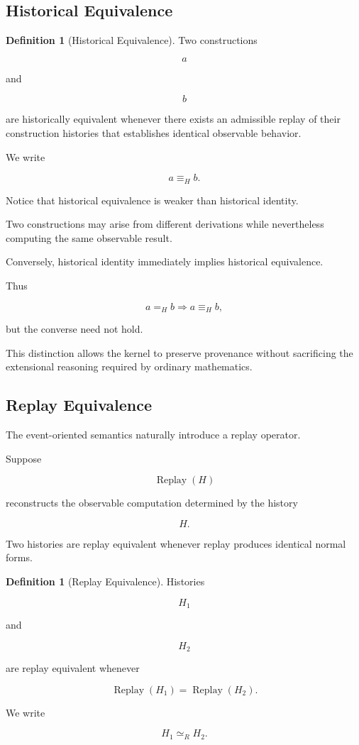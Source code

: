 \documentclass[12pt,oneside]{article}
\theoremstyle{definition}
\newtheorem{definition}[theorem]{Definition}
\theoremstyle{remark}
\DeclareMathOperator{\Replay}{Replay}
\begin{document}
\subsection{Historical Equivalence}

\begin{definition}[Historical Equivalence]

Two constructions

\[
a
\]

and

\[
b
\]

are historically equivalent whenever there exists an admissible replay of their
construction histories that establishes identical observable behavior.

We write

\[
a
\equiv_H
b.
\]

\end{definition}

Notice that historical equivalence is weaker than historical identity.

Two constructions may arise from different derivations while nevertheless
computing the same observable result.

Conversely, historical identity immediately implies historical equivalence.

Thus

\[
a
=
_H
b
\Longrightarrow
a
\equiv_H
b,
\]

but the converse need not hold.

This distinction allows the kernel to preserve provenance without sacrificing
the extensional reasoning required by ordinary mathematics.

\subsection{Replay Equivalence}

The event-oriented semantics naturally introduce a replay operator.

Suppose

\[
\Replay(H)
\]

reconstructs the observable computation determined by the history

\[
H.
\]

Two histories are replay equivalent whenever replay produces identical normal
forms.

\begin{definition}[Replay Equivalence]

Histories

\[
H_1
\]

and

\[
H_2
\]

are replay equivalent whenever

\[
\Replay(H_1)
=
\Replay(H_2).
\]

We write

\[
H_1
\simeq_R
H_2.
\]

\end{definition}
\end{document}
